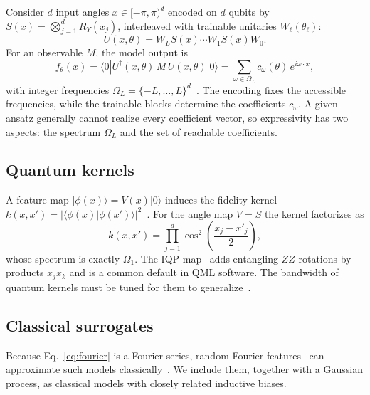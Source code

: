 \documentclass[11pt,letterpaper]{article}
\begin{document}
Consider $d$ input angles $x \in [-\pi,\pi)^d$ encoded on $d$ qubits by
$S(x) = \bigotimes_{j=1}^{d} R_Y(x_j)$, interleaved with trainable unitaries
$W_\ell(\theta_\ell)$:
\begin{equation}
  U(x,\theta) = W_L S(x) \cdots W_1 S(x) W_0 .
\end{equation}
For an observable $M$, the model output is
\begin{equation}
  f_\theta(x) = \langle 0|U^\dagger(x,\theta)\, M\, U(x,\theta)|0\rangle
  = \sum_{\omega \in \Omega_L} c_\omega(\theta)\, e^{i\omega\cdot x},
  \label{eq:fourier}
\end{equation}
with integer frequencies $\Omega_L = \{-L,\dots,L\}^d$~\cite{schuld2021effect}. The
encoding fixes the accessible frequencies, while the trainable blocks determine the
coefficients $c_\omega$. A given ansatz generally cannot realize every coefficient vector, so
expressivity has two aspects: the spectrum $\Omega_L$ and the set of reachable coefficients.

\subsection{Quantum kernels}

A feature map $|\phi(x)\rangle = V(x)|0\rangle$ induces the fidelity kernel
$k(x,x') = |\langle\phi(x)|\phi(x')\rangle|^2$~\cite{havlicek2019supervised,schuld2021kernel}.
For the angle map $V = S$ the kernel factorizes as
\begin{equation}
  k(x,x') = \prod_{j=1}^{d} \cos^2\!\left(\frac{x_j - x'_j}{2}\right),
  \label{eq:anglekernel}
\end{equation}
whose spectrum is exactly $\Omega_1$. The IQP map~\cite{havlicek2019supervised} adds
entangling $ZZ$ rotations by products $x_j x_k$ and is a common default in QML software. The
bandwidth of quantum kernels must be tuned for them to generalize~\cite{shaydulin2022bandwidth}.

\subsection{Classical surrogates}

Because Eq.~\eqref{eq:fourier} is a Fourier series, random Fourier
features~\cite{rahimi2007random} can approximate such models
classically~\cite{landman2022rff}. We include them, together with a Gaussian process, as
classical models with closely related inductive biases.

\end{document}
